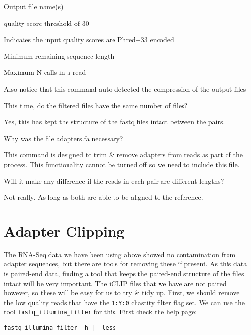 \begin{note}
\begin{description}[style=multiline,labelindent=0cm,align=right,leftmargin=0.8\descriptionlabelspace,rightmargin=1.5cm,font=\ttfamily]
\item[-o] Output file name(s)
\item[-q 30] quality score threshold of 30
\item[-P 33] Indicates the input quality scores are Phred+33 encoded
\item[-l 32] Minimum remaining sequence length
\item[--max-ns 1] Maximum N-calls in a read
\end{description}
Also notice that this command auto-detected the compression of the output files
\end{note}

\begin{questions}
This time, do the filtered files have the same number of files? \\
\begin{answer}
Yes, this has kept the structure of the fastq files intact between the pairs. \\
\end{answer}
Why was the file adapters.fa necessary? \\
\begin{answer}
This command is designed to trim \& remove adapters from reads as part of the process.
This functionality cannot be turned off so we need to include this file.\\
\end{answer}
Will it make any difference if the reads in each pair are different lengths?\\
\begin{answer}
Not really. As long as both are able to be aligned to the reference.
\end{answer}
\end{questions}


\section{Adapter Clipping}
The RNA-Seq data we have been using above showed no contamination from adapter sequences, but there are tools for removing these if present.
As this data is paired-end data, finding a tool that keeps the paired-end structure of the files intact will be very important.
The iCLIP files that we have are not paired however, so these will be easy for us to try \& tidy up.
First, we should remove the low quality reads that have the \texttt{1:Y:0} chastity filter flag set.
We can use the tool \texttt{fastq_illumina_filter} for this.
First check the help page:\\
\begin{lstlisting}
fastq_illumina_filter -h |  less
\end{lstlisting}

